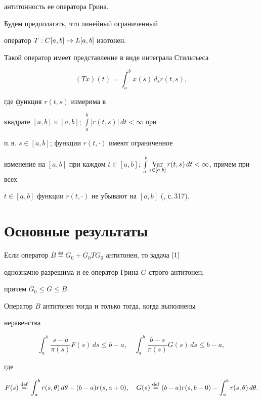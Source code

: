 антитонность ее оператора Грина.





Будем предполагать, что линейный ограниченный


оператор $T:C[a,b]\to L[a,b]$ изотонен.


Такой оператор имеет представление в виде интеграла Стильтьеса


\begin{equation*}%


(Tx)(t)=\int_a^bx(s)\,d_sr(t,s),


\end{equation*}


где функция $r(t,s)$ измерима в


квадрате $[a,b]\times[a,b]$; $\int\limits_a^b|r(t,s)|\,dt<\infty$ при


п.\,в. $s\in[a,b]$; функции $r(t,\cdot)$ имеют ограниченное


изменение на $[a,b]$ при каждом $t\in[a,b]$;  $\int\limits_a^b


\Vr\limits_{s\in[a,b]} r(t,s)\, dt<\infty$, причем при всех


$t\in[a,b]$ функции $r(t,\cdot)$ не убывают на $[a,b]$ (\cite{KVP}, с.\,317).








\section{Основные результаты}





\begin{thm}\label{t1}


Если оператор $B\eqdef G_0+G_0TG_0$ антитонен, то задача $\eqref{1}$


однозначно разрешима и ее оператор Грина $G$ строго антитонен,


причем $G_0\le G\le B$.


\end{thm}





\begin{thm}\label{t2}


Оператор $B$ антитонен тогда и только тогда, когда выполнены


неравенства


$$


\int_a^b\frac{s-a}{\pi(s)}F(s)\,ds\le b-a,\quad


\int_a^b\frac{b-s}{\pi(s)}G(s)\,ds\le b-a,


$$


где


$$


F(s)\eqdef\ii r(s,\te)\,d\te-(b-a)r(s,a+0),\quad


G(s)\eqdef (b-a)r(s,b-0)-\ii r(s,\te)\,d\te.


$$


\end{thm}





